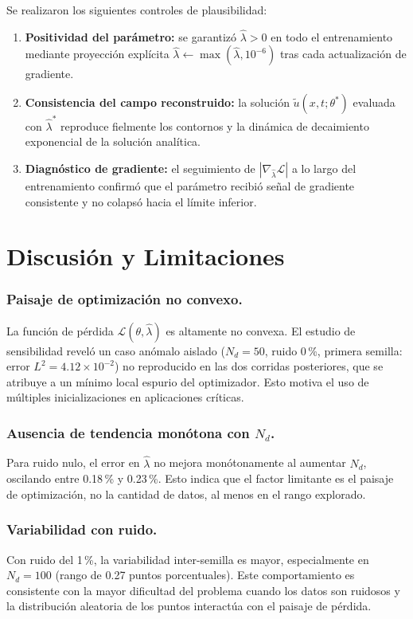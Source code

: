 \documentclass[12pt,a4paper]{article}
\newcommand{\lhat}{\hat{\lambda}}
\begin{document}
Se realizaron los siguientes controles de plausibilidad:
\begin{enumerate}
  \item \textbf{Positividad del parámetro:} se garantizó $\lhat>0$ en todo el
        entrenamiento mediante proyección explícita $\lhat\leftarrow
        \max(\lhat,10^{-6})$ tras cada actualización de gradiente.
  \item \textbf{Consistencia del campo reconstruido:} la solución $\tilde{u}(x,t;\theta^*)$
        evaluada con $\lhat^*$ reproduce fielmente los contornos y la dinámica de
        decaimiento exponencial de la solución analítica.
  \item \textbf{Diagnóstico de gradiente:} el seguimiento de $|\nabla_{\lhat}\mathcal{L}|$
        a lo largo del entrenamiento confirmó que el parámetro recibió señal de gradiente
        consistente y no colapsó hacia el límite inferior.
\end{enumerate}

\section{Discusión y Limitaciones}

\subsubsection*{Paisaje de optimización no convexo.}
La función de pérdida $\mathcal{L}(\theta,\lhat)$ es altamente no convexa. El estudio de
sensibilidad reveló un caso anómalo aislado ($N_d=50$, ruido 0\,\%, primera semilla:
error $L^2=4.12\times10^{-2}$) no reproducido en las dos corridas posteriores, que se
atribuye a un mínimo local espurio del optimizador. Esto motiva el uso de múltiples
inicializaciones en aplicaciones críticas.

\subsubsection*{Ausencia de tendencia monótona con $N_d$.}
Para ruido nulo, el error en $\lhat$ no mejora monótonamente al aumentar $N_d$, oscilando
entre 0.18\,\% y 0.23\,\%. Esto indica que el factor limitante es el paisaje de
optimización, no la cantidad de datos, al menos en el rango explorado.

\subsubsection*{Variabilidad con ruido.}
Con ruido del 1\,\%, la variabilidad inter-semilla es mayor, especialmente en $N_d=100$
(rango de 0.27 puntos porcentuales). Este comportamiento es consistente con la mayor
dificultad del problema cuando los datos son ruidosos y la distribución aleatoria de los
puntos interactúa con el paisaje de pérdida.
\end{document}

